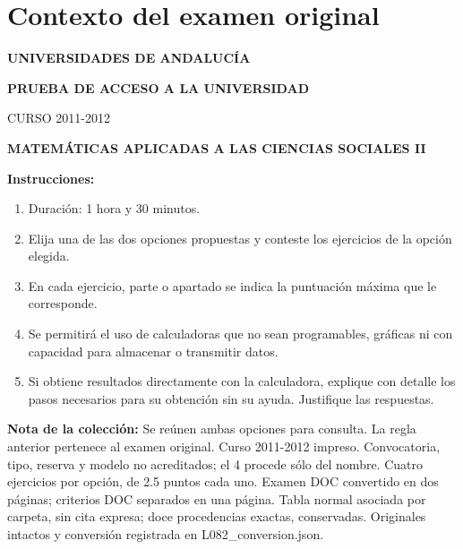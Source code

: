 \section*{Contexto del examen original}
\textbf{UNIVERSIDADES DE ANDALUCÍA}\par
\textbf{PRUEBA DE ACCESO A LA UNIVERSIDAD}\par
CURSO 2011-2012\par
\textbf{MATEMÁTICAS APLICADAS A LAS CIENCIAS SOCIALES II}

\textbf{Instrucciones:}
\begin{enumerate}[label=\textbf{\alph*)}]
  \item Duración: 1 hora y 30 minutos.
  \item Elija una de las dos opciones propuestas y conteste los ejercicios de la opción elegida.
  \item En cada ejercicio, parte o apartado se indica la puntuación máxima que le corresponde.
  \item Se permitirá el uso de calculadoras que no sean programables, gráficas ni con capacidad para almacenar o transmitir datos.
  \item Si obtiene resultados directamente con la calculadora, explique con detalle los pasos necesarios para su obtención sin su ayuda. Justifique las respuestas.
\end{enumerate}
\noindent\textbf{Nota de la colección:} Se reúnen ambas opciones para consulta. La regla anterior pertenece al examen original. Curso 2011-2012 impreso. Convocatoria, tipo, reserva y modelo no acreditados; el 4 procede sólo del nombre. Cuatro ejercicios por opción, de 2.5 puntos cada uno. Examen DOC convertido en dos páginas; criterios DOC separados en una página. Tabla normal asociada por carpeta, sin cita expresa; doce procedencias exactas, conservadas. Originales intactos y conversión registrada en L082\_conversion.json.
\par\medskip
